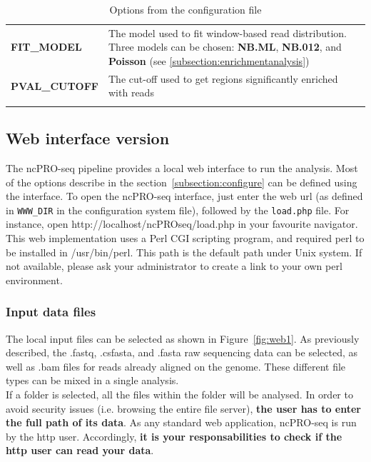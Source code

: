 \documentclass[12pt]{article}
\def \ncpip{ncPRO-seq}
\begin{document}
\begin{center}
\begin{longtable}{|p{8cm}|p{8cm}|}
\textbf{FIT\_MODEL} & The model used to fit window-based read distribution. Three models can be chosen: \textbf{NB.ML}, \textbf{NB.012}, and \textbf{Poisson} (see \ref{subsection:enrichmentanalysis})\\
\textbf{PVAL\_CUTOFF} & The cut-off used to get regions significantly enriched with reads\\
\hline
\caption{Options from the configuration file}
\label{tab:configureoptions}
\end{longtable}
\end{center}

\subsection{Web interface version}
\label{subsection:webinterface}
The \ncpip{} pipeline provides a local web interface to run the analysis. Most of the options describe in the section~\ref{subsection:configure} can be defined using the interface. To open the \ncpip{} interface, just enter the web url (as defined in \verb+WWW_DIR+ in the configuration system file), followed by the \verb+load.php+ file. For instance, open http://localhost/ncPROseq/load.php in your favourite navigator.\\
This web implementation uses a Perl CGI scripting program, and required perl to be installed in /usr/bin/perl. This path is the default path under Unix system. If not available, please ask your administrator to create a link to your own perl environment.

\subsubsection{Input data files}
The local input files can be selected as shown in Figure~\ref{fig:web1}. As previously described, the .fastq, .csfasta, and .fasta raw sequencing data can be selected, as well as .bam files for reads already aligned on the genome. These different file types can be mixed in a single analysis.\\
If a folder is selected, all the files within the folder will be analysed.
In order to avoid security issues (i.e. browsing the entire file server), \textbf{the user has to enter the full path of its data}.
As any standard web application, \ncpip{} is run by the http user. Accordingly, \textbf{it is your responsabilities to check if the http user can read your data}.
\end{document}

